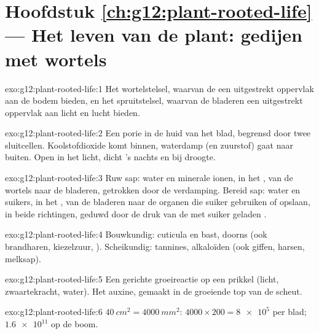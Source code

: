\section*{Hoofdstuk \ref{ch:g12:plant-rooted-life} --- Het leven van de plant: gedijen met wortels}

\begin{solution}{exo:g12:plant-rooted-life:1}
Het wortelstelsel, waarvan de  een uitgestrekt oppervlak aan de
bodem bieden, en het spruitstelsel, waarvan de bladeren een uitgestrekt
oppervlak aan licht en lucht bieden.
\end{solution}

\begin{solution}{exo:g12:plant-rooted-life:2}
Een porie in de huid van het blad, begrensd door twee sluitcellen.
Koolstofdioxide komt binnen, waterdamp (en zuurstof) gaat naar buiten.
Open in het licht, dicht 's nachts en bij droogte.
\end{solution}

\begin{solution}{exo:g12:plant-rooted-life:3}
Ruw sap: water en minerale ionen, in het , van de wortels naar de
bladeren, getrokken door de verdamping. Bereid sap: water en suikers, in
het , van de bladeren naar de organen die suiker gebruiken of
opslaan, in beide richtingen, geduwd door de druk van de met suiker
geladen .
\end{solution}

\begin{solution}{exo:g12:plant-rooted-life:4}
Bouwkundig: cuticula en bast, doorns (ook brandharen, kiezelzuur,
). Scheikundig: tannines, alkaloïden (ook giffen, harsen,
melksap).
\end{solution}

\begin{solution}{exo:g12:plant-rooted-life:5}
Een gerichte groeireactie op een prikkel (licht, zwaartekracht, water).
Het auxine, gemaakt in de groeiende top van de scheut.
\end{solution}

\begin{solution}{exo:g12:plant-rooted-life:6}
$\qty{40}{cm^2} = \qty{4000}{mm^2}$: $4000 \times 200 = \num{8e5}$
 per blad; $\num{1.6e11}$ op de boom.
\end{solution}

